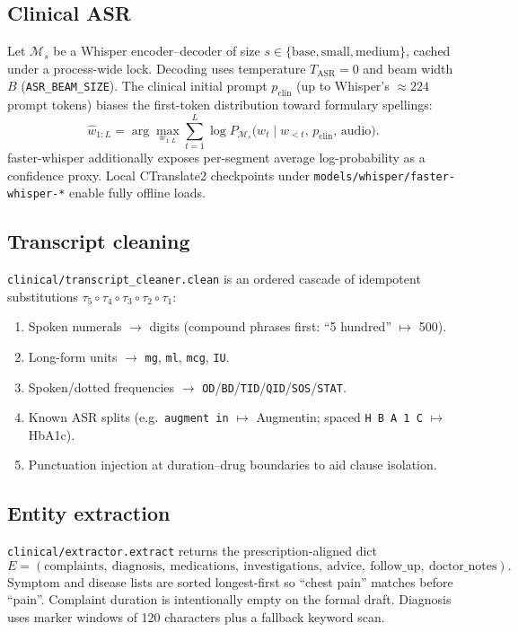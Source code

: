 \documentclass[11pt,a4paper]{article}
\begin{document}
\subsection{Clinical ASR}
Let $\mathcal{M}_s$ be a Whisper encoder--decoder of size $s\in\{\text{base},\text{small},\text{medium}\}$, cached under a process-wide lock. Decoding uses temperature $T_{\text{ASR}}=0$ and beam width $B$ (\texttt{ASR\_BEAM\_SIZE}). The clinical initial prompt $p_{\text{clin}}$ (up to Whisper's $\approx 224$ prompt tokens) biases the first-token distribution toward formulary spellings:
\begin{equation}
  \hat{w}_{1:L} = \arg\max_{w_{1:L}} \sum_{t=1}^{L} \log P_{\mathcal{M}_s}\bigl(w_t \mid w_{<t},\, p_{\text{clin}},\, \text{audio}\bigr).
\end{equation}
faster-whisper additionally exposes per-segment average log-probability as a confidence proxy. Local CTranslate2 checkpoints under \texttt{models/whisper/faster-whisper-*} enable fully offline loads.

\subsection{Transcript cleaning}
\texttt{clinical/transcript\_cleaner.clean} is an ordered cascade of idempotent substitutions $\tau_5\circ\tau_4\circ\tau_3\circ\tau_2\circ\tau_1$:
\begin{enumerate}[leftmargin=1.4em]
  \item Spoken numerals $\rightarrow$ digits (compound phrases first: ``5 hundred'' $\mapsto$ 500).
  \item Long-form units $\rightarrow$ \texttt{mg}, \texttt{ml}, \texttt{mcg}, \texttt{IU}.
  \item Spoken/dotted frequencies $\rightarrow$ \texttt{OD}/\texttt{BD}/\texttt{TID}/\texttt{QID}/\texttt{SOS}/\texttt{STAT}.
  \item Known ASR splits (e.g.\ \texttt{augment in} $\mapsto$ Augmentin; spaced \texttt{H B A 1 C} $\mapsto$ HbA1c).
  \item Punctuation injection at duration--drug boundaries to aid clause isolation.
\end{enumerate}

\subsection{Entity extraction}
\texttt{clinical/extractor.extract} returns the prescription-aligned dict
\[
  E = (\text{complaints},\ \text{diagnosis},\ \text{medications},\ \text{investigations},\ \text{advice},\ \text{follow\_up},\ \text{doctor\_notes}).
\]
Symptom and disease lists are sorted longest-first so ``chest pain'' matches before ``pain''. Complaint duration is intentionally empty on the formal draft. Diagnosis uses marker windows of 120 characters plus a fallback keyword scan.
\end{document}
